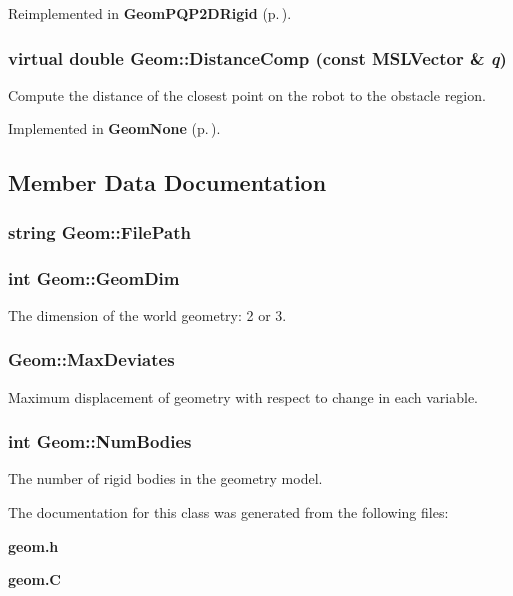 Reimplemented in {\bf Geom\-PQP2DRigid} {\rm (p.\,\pageref{classGeomPQP2DRigid_a4})}.
\subsubsection{\setlength{\rightskip}{0pt plus 5cm}virtual double Geom::Distance\-Comp (const {\bf MSLVector} \& {\em q})\hspace{0.3cm}{\tt  [pure virtual]}}\label{classGeom_a3}


Compute the distance of the closest point on the robot to the obstacle region.



Implemented in {\bf Geom\-None} {\rm (p.\,\pageref{classGeomNone_a3})}.

\subsection{Member Data Documentation}
\subsubsection{\setlength{\rightskip}{0pt plus 5cm}string Geom::File\-Path\hspace{0.3cm}{\tt  [protected]}}\label{classGeom_n0}


\subsubsection{\setlength{\rightskip}{0pt plus 5cm}int Geom::Geom\-Dim}\label{classGeom_m1}


The dimension of the world geometry: 2 or 3.

\subsubsection{ Geom::Max\-Deviates}\label{classGeom_m2}


Maximum displacement of geometry with respect to change in each variable.

\subsubsection{\setlength{\rightskip}{0pt plus 5cm}int Geom::Num\-Bodies}\label{classGeom_m0}


The number of rigid bodies in the geometry model.



The documentation for this class was generated from the following files:\begin{CompactItemize}
\item 
{\bf geom.h}\item 
{\bf geom.C}\end{CompactItemize}
